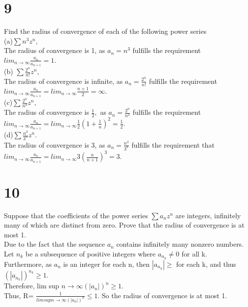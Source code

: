 \section*{9}
Find the radius of convergence of each of the following power series\\ 
(a)$\sum n^3 z^n,$ \\ 
The radius of convergence is 1, as $a_n=n^3$ fulfills the requirement $lim_{n \longrightarrow \infty} \frac{a_n}{a_{n+1}}=1.$\\ 
(b) $\sum \frac{2^n}{n!}z^n,$ \\
The radius of convergence is infinite, as $a_n =\frac{2^n}{n!}$ fulfills the requirement $lim_{n \longrightarrow \infty} \frac{a_n}{a_{n+1}}=lim_{n \longrightarrow \infty} \frac{n+1}{2}=\infty.$\\
(c)$\sum \frac{2^n}{n^2}z^n,$ \\
The radius of convergence is $\frac{1}{2},$ as $a_n=\frac{2^n}{n^2}$ fulfills the requirement \\ 
$lim_{n \longrightarrow \infty} \frac{a_n}{a_{n+1}}=lim_{n \longrightarrow \infty} \frac{1}{2}(1+\frac{1}{n})^2=\frac{1}{2}.$\\
(d)$\sum \frac{n^3}{3^n}z^n.$ \\ 
The radius of convergence is 3, as $a_n = \frac{n^3}{3^n}$ fulfills the requirement that \\ 
$lim_{n \longrightarrow \infty} \frac{a_n}{a_{n+1}}= lim_{n \longrightarrow \infty} 3(\frac{n}{n+1})^3=3.$\\ 
\section*{10}
Suppose that the coefficients of the power series $\sum a_n z^n$ are integers, infinitely many of which are distinct from zero. Prove that the radius of convergence is at most 1. \\ 


Due to the fact that the sequence ${a_n}$ contains infinitely many nonzero numbers. \\ 
Let ${n_k}$ be a subsequence of positive integers where $a_{n_k} \neq 0$ for all k. \\ 
Furthermore, as $a_n$ is an integer for each n, then $|a_n_k| \geq$ for each k, and thus $(|a_{n_k}|)^{n_k} \geq 1.$\\ 
Therefore, lim sup $n \longrightarrow \infty (|a_n|)^{n}\geq 1$. \\ 
Thus, R= $\frac{1}{lim sup n \longrightarrow \infty (|a_n|)^{n}} \leq 1.$ So the radius of convergence is at most 1. 
